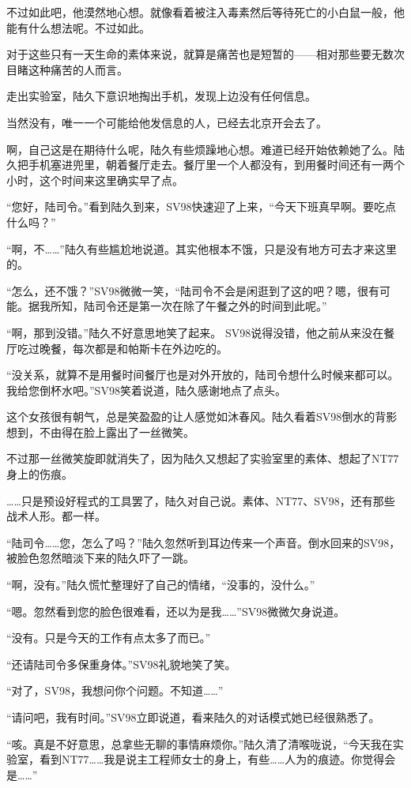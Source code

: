 不过如此吧，他漠然地心想。就像看着被注入毒素然后等待死亡的小白鼠一般，他能有什么想法呢。不过如此。

对于这些只有一天生命的素体来说，就算是痛苦也是短暂的——相对那些要无数次目睹这种痛苦的人而言。

走出实验室，陆久下意识地掏出手机，发现上边没有任何信息。

当然没有，唯一一个可能给他发信息的人，已经去北京开会去了。

啊，自己这是在期待什么呢，陆久有些烦躁地心想。难道已经开始依赖她了么。陆久把手机塞进兜里，朝着餐厅走去。餐厅里一个人都没有，到用餐时间还有一两个小时，这个时间来这里确实早了点。

“您好，陆司令。”看到陆久到来，SV98快速迎了上来，“今天下班真早啊。要吃点什么吗？”

“啊，不……”陆久有些尴尬地说道。其实他根本不饿，只是没有地方可去才来这里的。

“怎么，还不饿？”SV98微微一笑，“陆司令不会是闲逛到了这的吧？嗯，很有可能。据我所知，陆司令还是第一次在除了午餐之外的时间到此呢。”

“啊，那到没错。”陆久不好意思地笑了起来。 SV98说得没错，他之前从来没在餐厅吃过晚餐，每次都是和帕斯卡在外边吃的。

“没关系，就算不是用餐时间餐厅也是对外开放的，陆司令想什么时候来都可以。我给您倒杯水吧。”SV98笑着说道，陆久感谢地点了点头。

这个女孩很有朝气，总是笑盈盈的让人感觉如沐春风。陆久看着SV98倒水的背影想到，不由得在脸上露出了一丝微笑。

不过那一丝微笑旋即就消失了，因为陆久又想起了实验室里的素体、想起了NT77身上的伤痕。

……只是预设好程式的工具罢了，陆久对自己说。素体、NT77、SV98，还有那些战术人形。都一样。

“陆司令……您，怎么了吗？”陆久忽然听到耳边传来一个声音。倒水回来的SV98，被脸色忽然暗淡下来的陆久吓了一跳。

“啊，没有。”陆久慌忙整理好了自己的情绪，“没事的，没什么。”

“嗯。忽然看到您的脸色很难看，还以为是我……”SV98微微欠身说道。

“没有。只是今天的工作有点太多了而已。”

“还请陆司令多保重身体。”SV98礼貌地笑了笑。

“对了，SV98，我想问你个问题。不知道……”

“请问吧，我有时间。”SV98立即说道，看来陆久的对话模式她已经很熟悉了。

“咳。真是不好意思，总拿些无聊的事情麻烦你。”陆久清了清喉咙说，“今天我在实验室，看到NT77……我是说主工程师女士的身上，有些……人为的痕迹。你觉得会是……”

